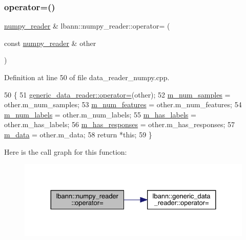 \subsubsection{\texorpdfstring{operator=()}{operator=()}}
{\footnotesize\ttfamily \hyperlink{classlbann_1_1numpy__reader}{numpy\+\_\+reader} \& lbann\+::numpy\+\_\+reader\+::operator= (\begin{DoxyParamCaption}\item[{const \hyperlink{classlbann_1_1numpy__reader}{numpy\+\_\+reader} \&}]{other }\end{DoxyParamCaption})}



Definition at line 50 of file data\+\_\+reader\+\_\+numpy.\+cpp.


\begin{DoxyCode}
50                                                                \{
51   \hyperlink{classlbann_1_1generic__data__reader_aec7e626e6efa2a4bf23f931e2ef8f607}{generic\_data\_reader::operator=}(other);
52   \hyperlink{classlbann_1_1numpy__reader_a5e0d81c07c950a2d81645566a2ccd965}{m\_num\_samples} = other.m\_num\_samples;
53   \hyperlink{classlbann_1_1numpy__reader_aef25f95077f565fa9616ec353b93f675}{m\_num\_features} = other.m\_num\_features;
54   \hyperlink{classlbann_1_1numpy__reader_ab311c3567e1ecc1770a4bc299ab0a3e2}{m\_num\_labels} = other.m\_num\_labels;
55   \hyperlink{classlbann_1_1numpy__reader_a0e8caa5609e706bf909b78c4c35377b8}{m\_has\_labels} = other.m\_has\_labels;
56   \hyperlink{classlbann_1_1numpy__reader_a7567338be86dff81afece19d031a942d}{m\_has\_responses} = other.m\_has\_responses;
57   \hyperlink{classlbann_1_1numpy__reader_a6d43a1eae0fedb6fa237b24cef8f37fa}{m\_data} = other.m\_data;
58   \textcolor{keywordflow}{return} *\textcolor{keyword}{this};
59 \}
\end{DoxyCode}
Here is the call graph for this function\+:\nopagebreak
\begin{figure}[H]
\begin{center}
\leavevmode
\includegraphics[width=330pt]{classlbann_1_1numpy__reader_acaa3bec8f120bd5a905219378f663cda_cgraph}
\end{center}
\end{figure}
\mbox{\label{classlbann_1_1numpy__reader_ae5f6ee086fbf0fa91d029808d454c1f0}} 
